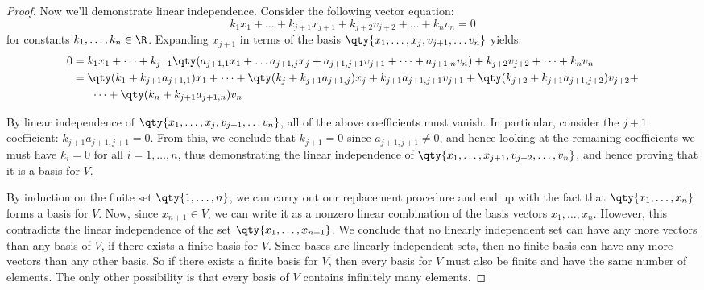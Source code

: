 \begin{proof}
  \vspace{3mm}

  Now we'll demonstrate linear independence. Consider the following vector equation:
  \[ k_1x_1+\dots+k_{j+1}x_{j+1}+k_{j+2}v_{j+2}+\dots+k_nv_n=0 \]
  for constants \( k_1,\dots,k_n\in\R \). Expanding \( x_{j+1} \) in terms of the basis \( \qty{x_1,\dots, x_j, v_{j+1},\dots v_n} \) yields:
  \begin{align*}
    0&= k_1x_1+\dots+k_{j+1}\qty(a_{j+1,1}x_1+\dots a_{j+1,j}x_j+a_{j+1,j+1}v_{j+1}+\dots+a_{j+1,n}v_n)+k_{j+2}v_{j+2}+\dots+k_nv_n\\
    &= \qty(k_1+k_{j+1}a_{j+1,1})x_1+\dots+\qty(k_j+k_{j+1}a_{j+1,j})x_j+k_{j+1}a_{j+1,j+1}v_{j+1}+\qty(k_{j+2}+k_{j+1}a_{j+1,j+2})v_{j+2}+\\
    &\hspace{6mm}\dots+\qty(k_n+k_{j+1}a_{j+1,n})v_n
  \end{align*}

  By linear independence of \( \qty{x_1,\dots, x_j, v_{j+1},\dots v_n} \), all of the above coefficients must vanish. In particular, consider the \( j+1 \) coefficient: \( k_{j+1}a_{j+1,j+1}=0 \). From this, we conclude that \( k_{j+1}=0 \) since \( a_{j+1,j+1}\neq 0 \), and hence looking at the remaining coefficients we must have \( k_i=0 \) for all \( i=1,\dots, n \), thus demonstrating the linear independence of \( \qty{x_1,\dots,x_{j+1},v_{j+2},\dots,v_n} \), and hence proving that it is a basis for \( V \).

  \vspace{3mm}

  By induction on the finite set \( \qty{1,\dots,n} \), we can carry out our replacement procedure and end up with the fact that \( \qty{x_1,\dots,x_n} \) forms a basis for \( V \). Now, since \( x_{n+1}\in V \), we can write it as a nonzero linear combination of the basis vectors \( x_1,\dots,x_n \). However, this contradicts the linear independence of the set \( \qty{x_1,\dots,x_{n+1}} \). We conclude that no linearly independent set can have any more vectors than any basis of \( V \), if there exists a finite basis for \( V \). Since bases are linearly independent sets, then no finite basis can have any more vectors than any other basis. So if there exists a finite basis for \( V \), then every basis for \( V \) must also be finite and have the same number of elements. The only other possibility is that every basis of \( V \) contains infinitely many elements.
\end{proof}

